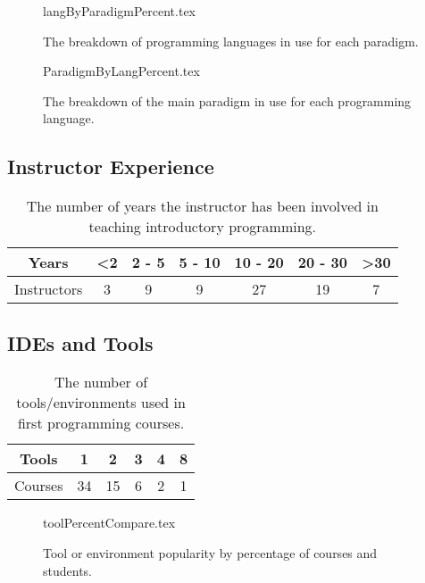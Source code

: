 \documentclass{sig-alternate}
\begin{document}
\begin{figure}
\begin{center}
{langByParadigmPercent.tex}
\end{center}
\caption{The breakdown of programming languages in use for each paradigm.}
\end{figure}


\begin{figure}
\begin{center}
{ParadigmByLangPercent.tex}
\end{center}
\caption{The breakdown of the main paradigm in use for each programming language.}
\end{figure}

\subsection{Instructor Experience}

\begin{table}[]
\centering
\caption{The number of years the instructor has been involved in teaching introductory programming.}
\label{tab:yearsTeaching}
\begin{tabular}{ccccccc}
\hline
Years       & \textless 2 & 2 - 5 & 5 - 10 & 10 - 20 & 20 - 30 & \textgreater 30 \\ \hline
Instructors & 3          & 9     & 9      & 27      & 19      & 7              \\ \hline
\end{tabular}
\end{table}

\subsection{IDEs and Tools}

\begin{table}[]
\centering
\caption{The number of tools/environments used in first programming courses.}
\label{tab:numTools}
\begin{tabular}{cccccc}
\hline
Tools   & 1  & 2  & 3 & 4 & 8 \\ \hline
Courses & 34 & 15 & 6 & 2 & 1 \\ \hline
\end{tabular}
\end{table}

\begin{figure}
\begin{center}
{toolPercentCompare.tex}
\caption{Tool or environment popularity by percentage of courses and students.}
\end{center}
\end{figure}
\end{document}
